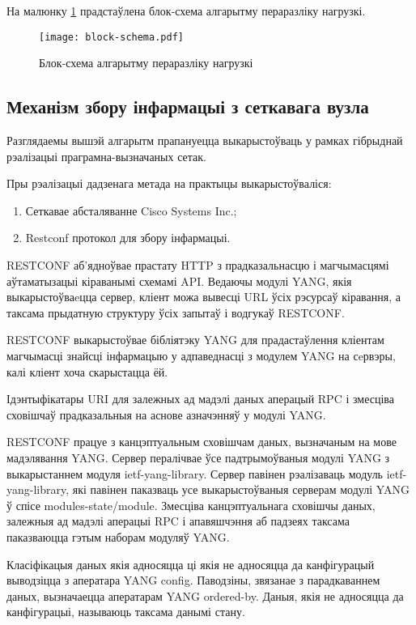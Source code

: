 На малюнку \ref{img: block-schema} прадстаўлена блок-схема алгарытму пераразліку нагрузкі.

\clearpage

\begin{figure}[h!]
    \centering
    \texttt{[image: block-schema.pdf]}
    \caption{Блок-схема алгарытму пераразліку нагрузкі}
    \label{img: block-schema}
\end{figure}

\subsection{Механізм збору інфармацыі з сеткавага вузла}

Разглядаемы вышэй алгарытм прапануецца выкарыстоўваць у рамках гібрыднай
рэалізацыі праграмна-вызначаных сетак.

Пры рэалізацыі дадзенага метада на практыцы выкарыстоўваліся:
\begin{enumerate}
    \item Сеткавае абсталяванне Cisco Systems Inc.;
    \item Restconf протокол для збору інфармацыі.
\end{enumerate}

RESTCONF аб'ядноўвае прастату HTTP з прадказальнасцю і магчымасцямі аўтаматызацыі кіраванымі схемамі API. Ведаючы модулі YANG, якія выкарыстоўваeцца сервер, кліент можа вывесці URL ўсіх рэсурсаў кіравання, а таксама прыдатную структуру ўсіх запытаў і водгукаў RESTCONF.

RESTCONF выкарыстоўвае бібліятэку YANG для прадастаўлення кліентам магчымасці знайсці інфармацыю у адпаведнасці з модулем YANG на сeрвэры, калі кліент хоча скарыстацца ёй.

Ідэнтыфікатары URI для залежных ад мадэлі даных аперацый RPC і змесціва сховішчаў прадказальныя на аснове азначэнняў у модулі YANG.

RESTCONF працуе з канцэптуальным сховішчам даных, вызначаным на мове мадэлявання YANG. Сервер пералічвае ўсе падтрымоўваныя модулі YANG з выкарыстаннем модуля ietf-yang-library. Сервер павінен рэалізаваць модуль ietf-yang-library, які павінен паказваць усе выкарыстоўваныя серверам модулі YANG ў спісе modules-state/module. Змесціва канцэптуальнага сховішчы даных, залежныя ад мадэлі аперацыі RPC і апавяшчэння аб падзеях таксама паказваюцца гэтым наборам модуляў YANG.

Класіфікацыя даных якія адносяцца ці якія не адносяцца да канфігурацый выводзіцца з аператара YANG config. Паводзіны, звязанае з парадкаваннем даных, вызначаецца аператарам YANG ordered-by. Даныя, якія не адносяцца да канфігурацыі, называюць таксама данымі стану.

